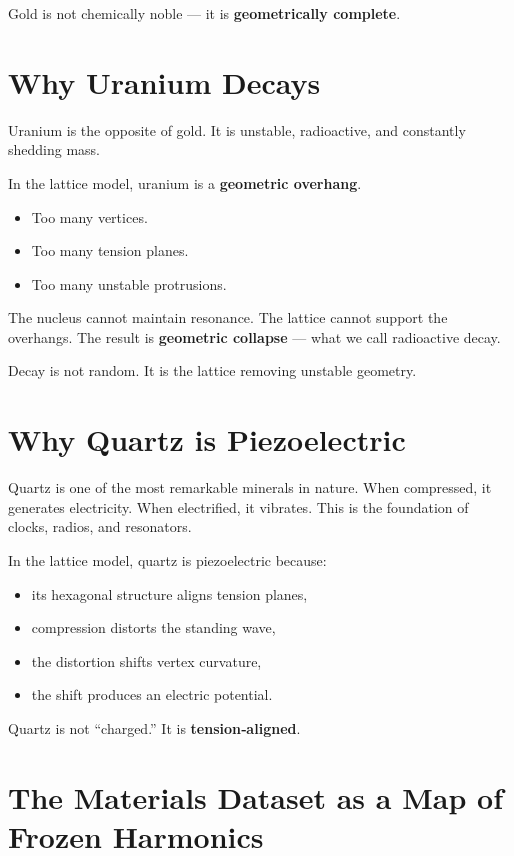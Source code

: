 \documentclass[11pt, letterpaper, openany]{book}
\begin{document}
Gold is not chemically noble — it is \textbf{geometrically complete}.

\section{Why Uranium Decays}

Uranium is the opposite of gold. It is unstable, radioactive, and constantly shedding mass.

In the lattice model, uranium is a \textbf{geometric overhang}.

\begin{itemize}
    \item Too many vertices.
    \item Too many tension planes.
    \item Too many unstable protrusions.
\end{itemize}

The nucleus cannot maintain resonance. The lattice cannot support the overhangs. The
result is \textbf{geometric collapse} — what we call radioactive decay.

Decay is not random.  
It is the lattice removing unstable geometry.

\section{Why Quartz is Piezoelectric}

Quartz is one of the most remarkable minerals in nature. When compressed, it generates
electricity. When electrified, it vibrates. This is the foundation of clocks, radios, and
resonators.

In the lattice model, quartz is piezoelectric because:

\begin{itemize}
    \item its hexagonal structure aligns tension planes,
    \item compression distorts the standing wave,
    \item the distortion shifts vertex curvature,
    \item the shift produces an electric potential.
\end{itemize}

Quartz is not “charged.”  
It is \textbf{tension‑aligned}.

\section{The Materials Dataset as a Map of Frozen Harmonics}
\end{document}
